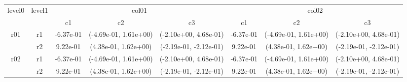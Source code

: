 \begin{tabular}{cccccccc}
\toprule
\multirow{2}{*}{level0} & \multirow{2}{*}{level1}&\multicolumn{3}{c}{col01}&\multicolumn{3}{c}{col02}\tabularnewline
\cmidrule(lr){3-5}
\cmidrule(lr){6-8}
&&c1&c2&c3&c1&c2&c3\tabularnewline
\midrule
\midrule
\multirow{2}{*}{r01}&r1&-6.37e-01& (-4.69e-01, 1.61e+00)& (-2.10e+00, 4.68e-01)&-6.37e-01& (-4.69e-01, 1.61e+00)& (-2.10e+00, 4.68e-01)\tabularnewline
&r2&9.22e-01& (4.38e-01, 1.62e+00)& (-2.19e-01, -2.12e-01)&9.22e-01& (4.38e-01, 1.62e+00)& (-2.19e-01, -2.12e-01)\tabularnewline
\midrule
\multirow{2}{*}{r02}&r1&-6.37e-01& (-4.69e-01, 1.61e+00)& (-2.10e+00, 4.68e-01)&-6.37e-01& (-4.69e-01, 1.61e+00)& (-2.10e+00, 4.68e-01)\tabularnewline
&r2&9.22e-01& (4.38e-01, 1.62e+00)& (-2.19e-01, -2.12e-01)&9.22e-01& (4.38e-01, 1.62e+00)& (-2.19e-01, -2.12e-01)\tabularnewline
\bottomrule
\end{tabular}
